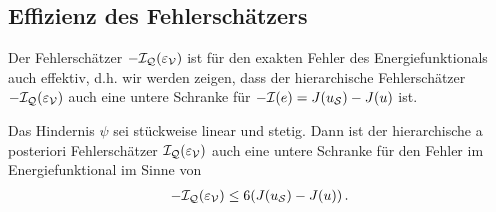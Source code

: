 \subsection{Effizienz des Fehlerschätzers}
\label{kap:4.1.5}

Der Fehlerschätzer  $-\mathcal I_{\mathcal Q}(\varepsilon_{\mathcal V})$ ist für den exakten Fehler des Energiefunktionals auch effektiv, d.h. wir werden zeigen, dass der hierarchische Fehlerschätzer $-\mathcal I_{\mathcal Q}(\varepsilon_{\mathcal V})$ auch eine untere Schranke für $-\mathcal I(e) = J(u_{\mathcal S}) - J(u)$ ist.


\begin{theorem}\label{theorem:4.25}
Das Hindernis $\psi$ sei stückweise linear und stetig. Dann ist der hierarchische a posteriori Fehlerschätzer $\mathcal I_{\mathcal Q}(\varepsilon_{\mathcal V})$ auch eine untere Schranke für den Fehler im Energiefunktional im Sinne von
\begin{align}
	-\mathcal I_{\mathcal Q}(\varepsilon_{\mathcal V}) \le 6 (J(u_{\mathcal S})-J(u)) \, .
\end{align}
\end{theorem}

